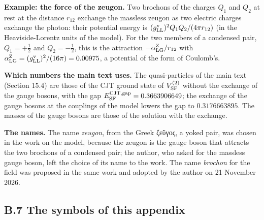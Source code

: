 \documentclass[
  10pt,
]{article}
\begin{document}
\textbf{Example: the force of the zeugon.} Two brochons of the charges
\(Q_1\) and \(Q_2\) at rest at the distance \(r_{12}\) exchange the
massless zeugon as two electric charges exchange the photon: their
potential energy is \((g^{\rm v}_{\rm LL})^2Q_1Q_2/(4\pi r_{12})\) (in
the Heaviside-Lorentz units of the model). For the two members of a
condensed pair, \(Q_1=+\tfrac12\) and \(Q_2=-\tfrac12\), this is the
attraction \(-\alpha^{\rm Z}_{\rm LG}/r_{12}\) with
\(\alpha^{\rm Z}_{\rm LG}=(g^{\rm v}_{\rm LL})^2/(16\pi)=0.00975\), a
potential of the form of Coulomb's.

\textbf{Which numbers the main text uses.} The quasi-particles of the
main text (Section 15.4) are those of the CJT ground state of
\(V^{(2)}_{\rm SF}\) without the exchange of the gauge bosons, with the
gap \(E^{\rm CJT,gap}_{\rm SF}=0.3663906649\); the exchange of the gauge
bosons at the couplings of the model lowers the gap to \(0.3176663895\).
The masses of the gauge bosons are those of the solution with the
exchange.

\textbf{The names.} The name \emph{zeugon}, from the Greek ζεῦγος, a
yoked pair, was chosen in the work on the model, because the zeugon is
the gauge boson that attracts the two brochons of a condensed pair; the
author, who asked for the massless gauge boson, left the choice of its
name to the work. The name \emph{brochon} for the field was proposed in
the same work and adopted by the author on 21 November 2026.

\hypertarget{b.7-the-symbols-of-this-appendix}{%
\subsection{B.7 The symbols of this
appendix}\label{b.7-the-symbols-of-this-appendix}}
\end{document}

